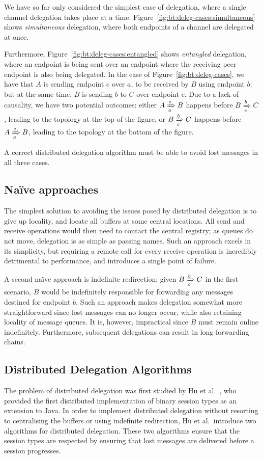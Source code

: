 \documentclass[
graybox,
envcountchap
]{svmult}
\begin{document}
\begin{bibunit}
  We have so far only considered the simplest case of delegation, where a single
  channel delegation takes place at a time.
  Figure~\ref{fig:bt:deleg-cases:simultaneous} shows \emph{simultaneous}
  delegation, where both endpoints of a channel are delegated at once.

  Furthermore, Figure~\ref{fig:bt:deleg-cases:entangled} shows \emph{entangled}
  delegation, where an endpoint is being sent over an endpoint where the
  receiving peer endpoint is also being delegated. In the case of
  Figure~\ref{fig:bt:deleg-cases}, we have that $A$ is sending endpoint $e$ over
  $a$, to be received by $B$ using endpoint $b$; but at the same time, $B$ is
  sending $b$ to $C$ over endpoint $c$. Due to a lack of causality, we have two
  potential outcomes: either $\triestosend{A}{e}{B}{a}$ happens before
  $\triestosend{B}{b}{C}{c}$, leading to the topology at the top of the figure,
  or $\triestosend{B}{b}{C}{c}$ happens before $\triestosend{A}{e}{B}{a}$,
  leading to the topology at the bottom of the figure.

  A correct distributed delegation algorithm must be able to avoid lost messages
  in all three cases.

  \subsection{Na\"ive approaches}
  The simplest solution to avoiding the issues posed by distributed delegation
  is to give up locality, and locate all buffers at some central locations. All
  send and receive operations would then need to contact the central registry;
  as queues do not move, delegation is as simple as passing names. Such an
  approach excels in its simplicity, but requiring a remote call for every
  receive operation is incredibly detrimental to performance, and introduces a
  single point of failure.

  A second na\"ive approach is indefinite redirection: given
  $\triestosend{B}{b}{C}{c}$ in the first scenario, $B$ would be indefinitely
  responsible for forwarding any messages destined for endpoint $b$. Such an
  approach makes delegation somewhat more straightforward since lost messages
  can no longer occur, while also retaining locality of message queues. It is,
  however, impractical since $B$ must remain online indefinitely. Furthermore,
  subsequent delegations can result in long forwarding chains.

  \subsection{Distributed Delegation Algorithms}
  The problem of distributed delegation was first studied by Hu et
  al.~\cite{HuYH08:session-java}, who provided the first distributed
  implementation of binary session types as an extension to Java. In order to
  implement distributed delegation without resorting to centralising the
  buffers or using indefinite redirection, Hu et al.\ introduce two algorithms
  for distributed delegation. These two algorithms ensure that the session types
  are respected by ensuring that lost messages are delivered before a session
  progresses.


\end{bibunit}
\end{document}
